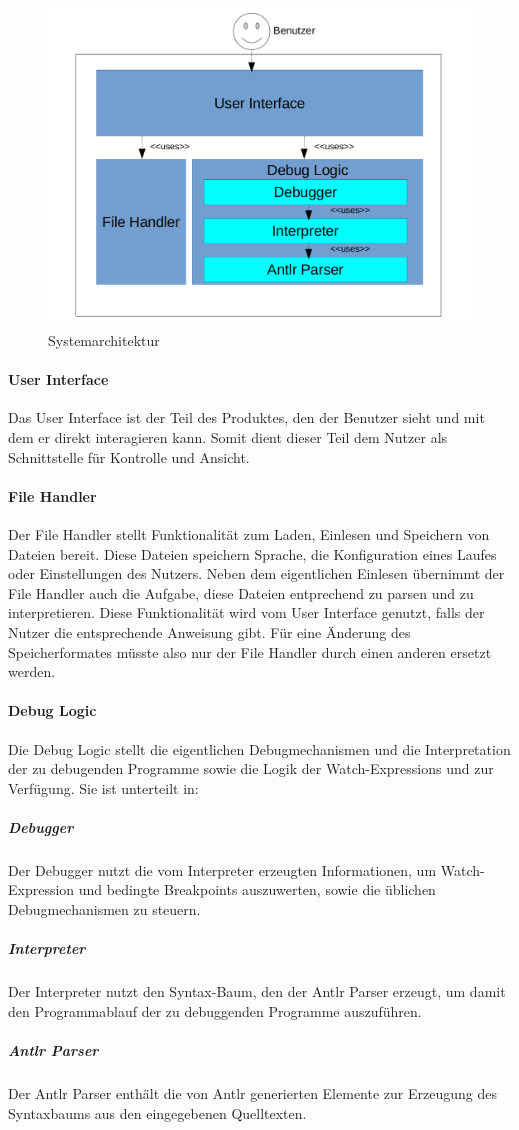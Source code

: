 \documentclass[parskip=full]{scrartcl}
\let\glsplgen\glsuseri
\begin{document}
\begin{figure}[!ht]
	\centering
	\includegraphics[width=1.0\textwidth]{Architektur}
	\caption{Systemarchitektur}
	\label{fig:Bild3} 

\end{figure}
\vspace{0.7cm}
	\paragraph{User Interface} Das User Interface ist der Teil des Produktes, den der Benutzer sieht und mit dem er direkt interagieren kann. Somit dient dieser Teil dem Nutzer als Schnittstelle für Kontrolle und Ansicht. 
	\paragraph{File Handler} Der File Handler stellt Funktionalität zum Laden, Einlesen und Speichern von Dateien bereit. Diese Dateien speichern Sprache, die Konfiguration eines Laufes oder Einstellungen des Nutzers. Neben dem eigentlichen Einlesen übernimmt der File Handler auch die Aufgabe, diese Dateien entprechend zu parsen und zu interpretieren. Diese Funktionalität wird vom User Interface genutzt, falls der Nutzer die entsprechende Anweisung gibt. Für eine Änderung des Speicherformates müsste also nur der File Handler durch einen anderen ersetzt werden.
	\paragraph{Debug Logic} Die Debug Logic stellt die eigentlichen Debugmechanismen und die Interpretation der zu debugenden Programme sowie die Logik der \glspl{Watch-Expression} und \glsplgen{bedingter Breakpoint} zur Verfügung. Sie ist unterteilt in: 
	\subparagraph{Debugger} Der Debugger nutzt die vom \gls{Interpreter} erzeugten Informationen, um Watch-Expression und bedingte Breakpoints auszuwerten, sowie die üblichen Debugmechanismen zu steuern.
	\subparagraph{Interpreter} Der Interpreter nutzt den Syntax-Baum, den der Antlr Parser erzeugt, um damit den Programmablauf der zu debuggenden Programme auszuführen. 
	\subparagraph{Antlr Parser} Der Antlr Parser enthält die von Antlr generierten Elemente zur Erzeugung des Syntaxbaums aus den eingegebenen Quelltexten.
	
\end{document}
